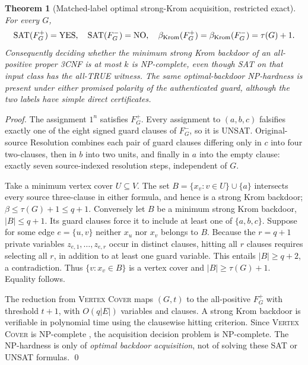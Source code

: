 \documentclass[11pt]{article}
\newtheorem{theorem}{Theorem}
\begin{document}
\begin{theorem}[Matched-label optimal strong-Krom acquisition, restricted exact]
For every $G$,
\[
\operatorname{SAT}(F_G^+)=\mathrm{YES},\quad
\operatorname{SAT}(F_G^-)=\mathrm{NO},\quad
\beta_{\rm Krom}(F_G^+)=\beta_{\rm Krom}(F_G^-)=\tau(G)+1.
\]
Consequently deciding whether the minimum strong Krom backdoor of an \emph{all-positive proper 3CNF} is at most $k$ is NP-complete, even though SAT on that input class has the all-TRUE witness. The same optimal-backdoor NP-hardness is present under either promised polarity of the authenticated guard, although the two labels have simple direct certificates.
\end{theorem}
\begin{proof}
The assignment $1^n$ satisfies $F_G^+$. Every assignment to $(a,b,c)$ falsifies exactly one of the eight signed guard clauses of $F_G^-$, so it is UNSAT. Original-source Resolution combines each pair of guard clauses differing only in $c$ into four two-clauses, then in $b$ into two units, and finally in $a$ into the empty clause: exactly seven source-indexed resolution steps, independent of $G$.

Take a minimum vertex cover $U\subseteq V$. The set $B=\{x_v:v\in U\}\cup\{a\}$ intersects every source three-clause in either formula, and hence is a strong Krom backdoor; $\beta\le\tau(G)+1\le q+1$. Conversely let $B$ be a minimum strong Krom backdoor, $|B|\le q+1$. Its guard clauses force it to include at least one of $\{a,b,c\}$. Suppose for some edge $e=\{u,v\}$ neither $x_u$ nor $x_v$ belongs to $B$. Because the $r=q+1$ private variables $z_{e,1},\ldots,z_{e,r}$ occur in distinct clauses, hitting all $r$ clauses requires selecting all $r$, in addition to at least one guard variable. This entails $|B|\ge q+2$, a contradiction. Thus $\{v:x_v\in B\}$ is a vertex cover and $|B|\ge\tau(G)+1$. Equality follows.

The reduction from \textsc{Vertex Cover} maps $(G,t)$ to the all-positive $F_G^+$ with threshold $t+1$, with $O(q|E|)$ variables and clauses. A strong Krom backdoor is verifiable in polynomial time using the clausewise hitting criterion. Since \textsc{Vertex Cover} is NP-complete \cite{karp1972}, the acquisition decision problem is NP-complete. The NP-hardness is only of \emph{optimal backdoor acquisition}, not of solving these SAT or UNSAT formulas. \qed
\end{proof}
\end{document}
